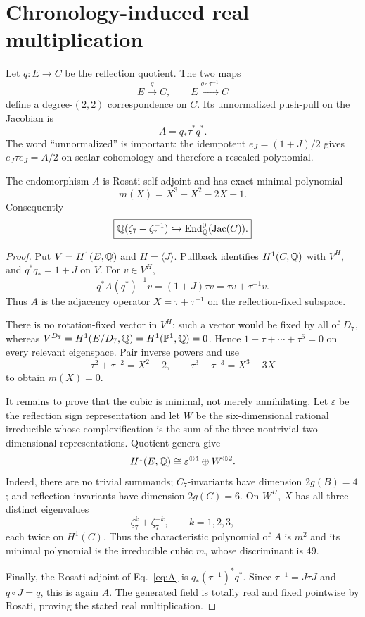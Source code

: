 \section{Chronology-induced real multiplication}\label{sec:rm}

Let $q:E\to C$ be the reflection quotient.  The two maps
\[
 E\overset{q}{\longrightarrow}C,
 \qquad
 E\overset{q\circ\tau^{-1}}{\longrightarrow}C
\]
define a degree-$(2,2)$ correspondence on $C$.  Its unnormalized push-pull on
the Jacobian is
\begin{equation}\label{eq:A}
 A=q_*\tau^*q^*.
\end{equation}
The word ``unnormalized'' is important: the idempotent
$e_J=(1+J)/2$ gives $e_J\tau e_J=A/2$ on scalar cohomology and therefore a
rescaled polynomial.

\begin{theorem}\label{thm:rm}
The endomorphism $A$ is Rosati self-adjoint and has exact minimal polynomial
\begin{equation}\label{eq:minpoly}
 m(X)=X^3+X^2-2X-1.
\end{equation}
Consequently
\[
 \boxed{
 \mathbb Q(\zeta_7+\zeta_7^{-1})
 \hookrightarrow \operatorname{End}_\mathbb Q^0(\operatorname{Jac}(C)).
 }
\]
\end{theorem}

\begin{proof}
Put $V=H^1(E,\mathbb Q)$ and $H=\langle J\rangle$.  Pullback identifies
$H^1(C,\mathbb Q)$ with $V^H$, and $q^*q_*=1+J$ on $V$.  For $v\in V^H$,
\[
 q^*A(q^*)^{-1}v
 =(1+J)\tau v
 =\tau v+\tau^{-1}v.
\]
Thus $A$ is the adjacency operator $X=\tau+\tau^{-1}$ on the reflection-fixed
subspace.

There is no rotation-fixed vector in $V^H$: such a vector would be fixed by
all of $D_7$, whereas
$V^{D_7}=H^1(E/D_7,\mathbb Q)=H^1(\mathbb P^1,\mathbb Q)=0$.  Hence
$1+\tau+\cdots+\tau^6=0$ on every relevant eigenspace.  Pair inverse powers
and use
\[
 \tau^2+\tau^{-2}=X^2-2,
 \qquad
 \tau^3+\tau^{-3}=X^3-3X
\]
to obtain $m(X)=0$.

It remains to prove that the cubic is minimal, not merely annihilating.  Let
$\varepsilon$ be the reflection sign representation and let $W$ be the
six-dimensional rational irreducible whose complexification is the sum of
the three nontrivial two-dimensional representations.  Quotient genera give
\[
 H^1(E,\mathbb Q)\cong\varepsilon^{\oplus4}\oplus W^{\oplus2}.
\]
Indeed, there are no trivial summands; $C_7$-invariants have dimension
$2g(B)=4$; and reflection invariants have dimension $2g(C)=6$.  On $W^H$,
$X$ has all three distinct eigenvalues
\[
 \zeta_7^k+\zeta_7^{-k},\qquad k=1,2,3,
\]
each twice on $H^1(C)$.  Thus the characteristic polynomial of $A$ is
$m^2$ and its minimal polynomial is the irreducible cubic $m$, whose
discriminant is 49.

Finally, the Rosati adjoint of Eq.~\eqref{eq:A} is
$q_*(\tau^{-1})^*q^*$.  Since $\tau^{-1}=J\tau J$ and $q\circ J=q$, this is
again $A$.  The generated field is totally real and fixed pointwise by
Rosati, proving the stated real multiplication.
\end{proof}

